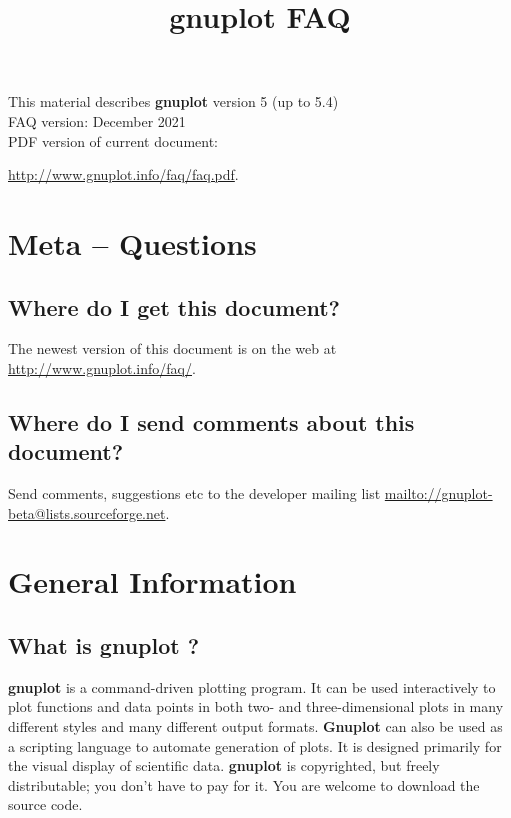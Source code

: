 \documentclass[letter,11pt]{article}
\def\http#1{{\small\href{http://#1}{\url{http://#1}}}}
\def\mailto#1{{\small\href{mailto://#1}{\url{mailto://#1}}}}
\newcommand{\mailto}[1]%
            {\htmladdnormallink{\latex{\url{<#1>}}\html{\textit{#1}}}%
                {mailto:#1}%
            }
\newcommand{\http}[1]%
            {\htmladdnormallink{\latex{\url{http://#1}}%
                    \html{\textit{http://#1}}}%
                {http://#1}%
            }
\newcommand{\gnuplot}{\textbf{gnuplot }}
\newcommand{\Gnuplot}{\textbf{Gnuplot }}
\begin{document}
\title{\gnuplot FAQ}
\author{}
\date{}
\maketitle

\noindent
This material describes \gnuplot version 5 (up to 5.4)
        \\
FAQ version: December 2021
        \\
PDF version of current document: {\http{www.gnuplot.info/faq/faq.pdf}.


\tableofcontents

\newpage
\setcounter{section}{-1}
\section{Meta -- Questions}

\subsection{Where do I get this document?}

The newest version of this document is on the web at
\http{www.gnuplot.info/faq/}.

\subsection{Where do I send comments about this document?}

Send comments, suggestions etc to the developer mailing list
\mailto{gnuplot-beta@lists.sourceforge.net}.

\section{General Information}

\subsection{What is \gnuplot?}

\gnuplot is a command-driven plotting program.
It can be used interactively to plot functions and data points in
both two- and three-dimensional plots in many different styles and
many different output formats.  \Gnuplot can also be used as a
scripting language to automate generation of plots.
It is designed primarily for the visual display of scientific data.
\gnuplot is copyrighted, but freely distributable;
you don't have to pay for it. You are welcome to download the source code.


}
\end{document}
